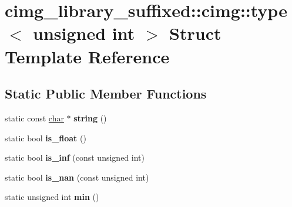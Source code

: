 \hypertarget{structcimg__library__suffixed_1_1cimg_1_1type_3_01unsigned_01int_01_4}{}\section{cimg\+\_\+library\+\_\+suffixed\+:\+:cimg\+:\+:type$<$ unsigned int $>$ Struct Template Reference}
\label{structcimg__library__suffixed_1_1cimg_1_1type_3_01unsigned_01int_01_4}
\subsection*{Static Public Member Functions}
\begin{DoxyCompactItemize}
\item 
\mbox{\label{structcimg__library__suffixed_1_1cimg_1_1type_3_01unsigned_01int_01_4_a11fe981ee6d8e0357d919c41061dc173}} 
static const \hyperlink{classchar}{char} $\ast$ {\bfseries string} ()
\item 
\mbox{\label{structcimg__library__suffixed_1_1cimg_1_1type_3_01unsigned_01int_01_4_adfd810516fe355f866c55f6caa220af3}} 
static bool {\bfseries is\+\_\+float} ()
\item 
\mbox{\label{structcimg__library__suffixed_1_1cimg_1_1type_3_01unsigned_01int_01_4_abf57b9d1150e6df6a9c09eab4fc79f81}} 
static bool {\bfseries is\+\_\+inf} (const unsigned int)
\item 
\mbox{\label{structcimg__library__suffixed_1_1cimg_1_1type_3_01unsigned_01int_01_4_a3feb26909c08ae4cd82e5bc8730b7a87}} 
static bool {\bfseries is\+\_\+nan} (const unsigned int)
\item 
\mbox{\label{structcimg__library__suffixed_1_1cimg_1_1type_3_01unsigned_01int_01_4_a6ef9cc96e90c1b4465c2dcad72a3450b}} 
static unsigned int {\bfseries min} ()
\item 
\mbox{\label{structcimg__library__suffixed_1_1cimg_1_1type_3_01unsigned_01int_01_4_a45d1747956c26023092b03f87052d53a}} 

\end{DoxyCompactItemize}
